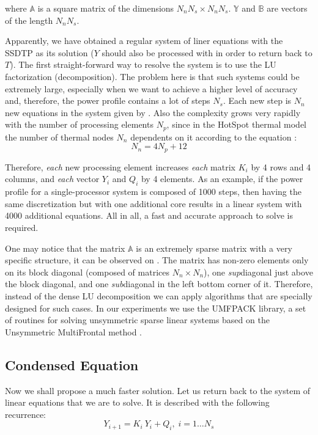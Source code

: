 where $\mathbb{A}$ is a square matrix of the dimensions $N_n N_s \times N_n N_s$. $\mathbb{Y}$ and $\mathbb{B}$ are vectors of the length $N_n N_s$.

Apparently, we have obtained a regular system of liner equations with the SSDTP as its solution ($Y$ should also be processed with  in order to return back to $T$). The first straight-forward way to resolve the system is to use the LU factorization (decomposition). The problem here is that such systems could be extremely large, especially when we want to achieve a higher level of accuracy and, therefore, the power profile contains a lot of steps $N_s$. Each new step is $N_n$ new equations in the system given by . Also the complexity grows very rapidly with the number of processing elements $N_p$, since in the HotSpot thermal model the number of thermal nodes $N_n$ dependents on it according to the equation \cite{rao2008}:
\[
  N_n = 4 N_p + 12
\]

Therefore, \emph{each} new processing element increases \emph{each} matrix $K_i$ by 4 rows and 4 columns, and \emph{each} vector $Y_i$ and $Q_i$ by 4 elements. As an example, if the power profile for a single-processor system is composed of 1000 steps, then having the same discretization but with one additional core results in a linear system with 4000 additional equations. All in all, a fast and accurate approach to solve  is required.

One may notice that the matrix $\mathbb{A}$ is an extremely sparse matrix with a very specific structure, it can be observed on . The matrix has non-zero elements only on its block diagonal (composed of matrices $N_n \times N_n$), one \emph{sup}diagonal just above the block diagonal, and one \emph{sub}diagonal in the left bottom corner of it. Therefore, instead of the dense LU decomposition we can apply algorithms that are specially designed for such cases. In our experiments we use the UMFPACK library, a set of routines for solving unsymmetric sparse linear systems based on the Unsymmetric MultiFrontal method \cite{umfpack2004}.

\subsection{Condensed Equation}
Now we shall propose a much faster solution. Let us return back to the system of linear equations that we are to solve. It is described with the following recurrence:
\begin{equation} \label{eq:ce-recurrent}
  Y_{i + 1} = K_i \: Y_i + Q_i, \; i = 1 \dots N_s
\end{equation}

